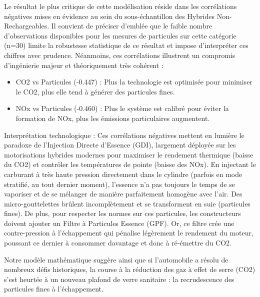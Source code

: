 Le résultat le plus critique de cette modélisation réside dans les corrélations négatives mises en évidence au sein du sous-échantillon des Hybrides Non-Rechargeables. Il convient de préciser d'emblée que le faible nombre d'observations disponibles pour les mesures de particules sur cette catégorie (n=30) limite la robustesse statistique de ce résultat et impose d'interpréter ces chiffres avec prudence. Néanmoins, ces corrélations illustrent un compromis d'ingénierie majeur et théoriquement très cohérent :

\vspace{0.6em}

\begin{itemize}
    \item CO2 vs Particules (-0.447) : Plus la technologie est optimisée pour minimiser le CO2, plus elle tend à générer des particules fines.
\end{itemize}

\vspace{0.6em}

\begin{itemize}
    \item NOx vs Particules (-0.460) : Plus le système est calibré pour éviter la formation de NOx, plus les émissions particulaires augmentent.
\end{itemize}

\vspace{0.6em}

Interprétation technologique : Ces corrélations négatives mettent en lumière le paradoxe de l'Injection Directe d'Essence (GDI), largement déployée sur les motorisations hybrides modernes pour maximiser le rendement thermique (baisse du CO2) et contrôler les températures de pointe (baisse des NOx). En injectant le carburant à très haute pression directement dans le cylindre (parfois en mode stratifié, au tout dernier moment), l'essence n'a pas toujours le temps de se vaporiser et de se mélanger de manière parfaitement homogène avec l'air. Des micro-gouttelettes brûlent incomplètement et se transforment en suie (particules fines). De plus, pour respecter les normes sur ces particules, les constructeurs doivent ajouter un Filtre à Particules Essence (GPF). Or, ce filtre crée une contre-pression à l'échappement qui pénalise légèrement le rendement du moteur, poussant ce dernier à consommer davantage et donc à ré-émettre du CO2.

\vspace{0.6em}

Notre modèle mathématique suggère ainsi que si l'automobile a résolu de nombreux défis historiques, la course à la réduction des gaz à effet de serre (CO2) s'est heurtée à un nouveau plafond de verre sanitaire : la recrudescence des particules fines à l'échappement.


